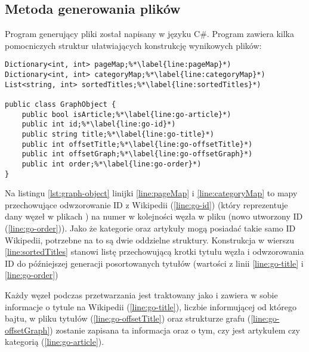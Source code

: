 

\subsection{Metoda generowania plików}

Program generujący pliki  został napisany w języku C\#.
Program zawiera kilka pomocniczych struktur ułatwiających konstrukcję wynikowych plików:

\begin{lstlisting}[caption={Pomocnicze struktury dla programu generującego pliki dla aplikacji}, label=lst:graph-object]
Dictionary<int, int> pageMap;%*\label{line:pageMap}*)
Dictionary<int, int> categoryMap;%*\label{line:categoryMap}*)
List<string, int> sortedTitles;%*\label{line:sortedTitles}*)

public class GraphObject {
    public bool isArticle;%*\label{line:go-article}*)
    public int id;%*\label{line:go-id}*)
    public string title;%*\label{line:go-title}*)
    public int offsetTitle;%*\label{line:go-offsetTitle}*)
    public int offsetGraph;%*\label{line:go-offsetGraph}*)
    public int order;%*\label{line:go-order}*)
}
\end{lstlisting}

Na listingu \ref{lst:graph-object} linijki \ref{line:pageMap} i \ref{line:categoryMap} to mapy przechowujące odwzorowanie ID z Wikipedii (\ref{line:go-id}) (który reprezentuje dany węzeł w plikach ) na numer w kolejności węzła w pliku  (nowo utworzony ID (\ref{line:go-order})). Jako że kategorie oraz artykuły mogą posiadać takie samo ID Wikipedii, potrzebne na to są dwie oddzielne struktury. Konstrukcja w wierszu \ref{line:sortedTitles} stanowi listę przechowującą krotki tytułu węzła i odwzorowania ID do późniejszej generacji posortowanych tytułów (wartości z linii \ref{line:go-title} i \ref{line:go-order})

Każdy węzeł podczas przetwarzania jest traktowany jako  i zawiera w sobie informacje o tytule na Wikipedii (\ref{line:go-title}), liczbie informującej od którego bajtu, w pliku tytułów  (\ref{line:go-offsetTitle}) oraz strukturze grafu  (\ref{line:go-offsetGraph}) zostanie zapisana ta informacja oraz o tym, czy jest artykułem czy kategorią (\ref{line:go-article}).

